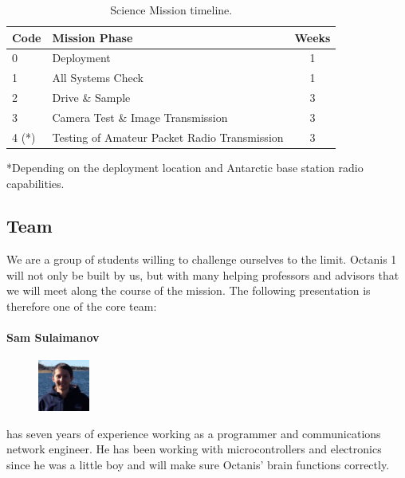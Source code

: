 \documentclass[a4paper,12pt]{article}
\begin{document}
\begin{table}[h!]
\centering
\begin{tabular}{ l | l | c }
\bfseries{Code} & \bfseries{Mission Phase} & \bfseries{Weeks} \\
\hline

0 & Deployment & 1 \\
1 & All Systems Check & 1 \\
2 & Drive \& Sample & 3 \\
3 & Camera Test \& Image Transmission & 3 \\
4 (*)& Testing of Amateur Packet Radio Transmission  & 3 \\

\end{tabular}
\caption{Science Mission timeline.}
*Depending on the deployment location and Antarctic base station radio capabilities.

\end{table}

\pagebreak

\subsection{Team}

We are a group of students willing to challenge ourselves to the limit. Octanis 1 will not only be built by us, but with many helping professors and advisors that we will meet along the course of the mission. The following presentation is therefore one of the core team:


\paragraph{Sam Sulaimanov} 
\begin{figure}
    \centering
    \vspace{-13pt}
    \includegraphics[width=0.15\textwidth]{sam}
\end{figure} has seven years of experience working as a programmer and communications network engineer. He has been working with microcontrollers and electronics since he was a little boy and will make sure Octanis' brain functions correctly.
\\ \\
\end{document}
